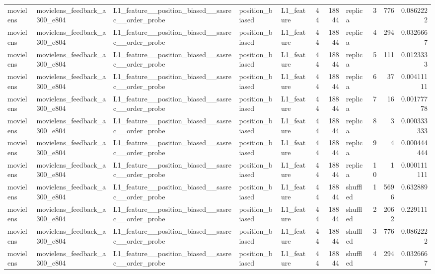 \begin{table}[htbp!]
\begin{tabular}{lllllrrlrrr}
movielens & movielens\_feedback\_a300\_e804 & L1\_feature\_\_position\_biased\_\_sasrec\_\_order\_probe & position\_biased & L1\_feature & 44 & 18844 & replica & 3 & 776 & 0.0862222 \\
movielens & movielens\_feedback\_a300\_e804 & L1\_feature\_\_position\_biased\_\_sasrec\_\_order\_probe & position\_biased & L1\_feature & 44 & 18844 & replica & 4 & 294 & 0.0326667 \\
movielens & movielens\_feedback\_a300\_e804 & L1\_feature\_\_position\_biased\_\_sasrec\_\_order\_probe & position\_biased & L1\_feature & 44 & 18844 & replica & 5 & 111 & 0.0123333 \\
movielens & movielens\_feedback\_a300\_e804 & L1\_feature\_\_position\_biased\_\_sasrec\_\_order\_probe & position\_biased & L1\_feature & 44 & 18844 & replica & 6 & 37 & 0.00411111 \\
movielens & movielens\_feedback\_a300\_e804 & L1\_feature\_\_position\_biased\_\_sasrec\_\_order\_probe & position\_biased & L1\_feature & 44 & 18844 & replica & 7 & 16 & 0.00177778 \\
movielens & movielens\_feedback\_a300\_e804 & L1\_feature\_\_position\_biased\_\_sasrec\_\_order\_probe & position\_biased & L1\_feature & 44 & 18844 & replica & 8 & 3 & 0.000333333 \\
movielens & movielens\_feedback\_a300\_e804 & L1\_feature\_\_position\_biased\_\_sasrec\_\_order\_probe & position\_biased & L1\_feature & 44 & 18844 & replica & 9 & 4 & 0.000444444 \\
movielens & movielens\_feedback\_a300\_e804 & L1\_feature\_\_position\_biased\_\_sasrec\_\_order\_probe & position\_biased & L1\_feature & 44 & 18844 & replica & 10 & 1 & 0.000111111 \\
movielens & movielens\_feedback\_a300\_e804 & L1\_feature\_\_position\_biased\_\_sasrec\_\_order\_probe & position\_biased & L1\_feature & 44 & 18844 & shuffled & 1 & 5696 & 0.632889 \\
movielens & movielens\_feedback\_a300\_e804 & L1\_feature\_\_position\_biased\_\_sasrec\_\_order\_probe & position\_biased & L1\_feature & 44 & 18844 & shuffled & 2 & 2062 & 0.229111 \\
movielens & movielens\_feedback\_a300\_e804 & L1\_feature\_\_position\_biased\_\_sasrec\_\_order\_probe & position\_biased & L1\_feature & 44 & 18844 & shuffled & 3 & 776 & 0.0862222 \\
movielens & movielens\_feedback\_a300\_e804 & L1\_feature\_\_position\_biased\_\_sasrec\_\_order\_probe & position\_biased & L1\_feature & 44 & 18844 & shuffled & 4 & 294 & 0.0326667 \\

\end{tabular}
\end{table}
